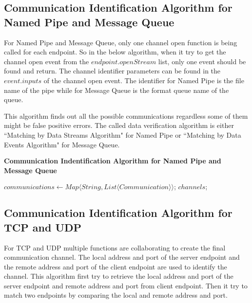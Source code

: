 \subsection{Communication Identification Algorithm for Named Pipe and Message Queue}
For Named Pipe and Message Queue, only one channel open function is being called for each endpoint. So in the below algorithm, when it try to get the channel open event from the $endpoint.openStream$ list, only one event should be found and return. The channel identifier parameters can be found in the $event.inputs$ of the channel open event. The identifier for Named Pipe is the file name of the pipe while for Message Queue is the format queue name of the queue. 

This algorithm finds out all the possible communications regardless some of them might be false positive errors. The called data verification algorithm is either ``Matching by Data Streams Algorithm" for Named Pipe or ``Matching by Data Events Algorithm" for Message Queue.

\begin{algorithm}[H]
\DontPrintSemicolon
\caption{{\bf Communication Indentification Algorithm for Named Pipe and Message Queue} \label{channelAlg1}}
$communications \leftarrow Map \langle String, List \langle Communication \rangle \rangle$;\; 
\KwRet $channels$;\;
\end{algorithm} 


\subsection{Communication Identification Algorithm for TCP and UDP}
For TCP and UDP multiple functions are collaborating to create the final communication channel. The local address and port of the server endpoint and the remote address and port of the client endpoint are used to identify the channel. This algorithm first try to retrieve the local address and port of the server endpoint and remote address and port from client endpoint. Then it try to match two endpoints by comparing the local and remote address and port.

